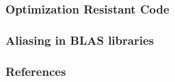 \documentclass{beamer}
\begin{document}
  \begin{frame}
    \frametitle{Optimization Resistant Code}




  \end{frame}

  \begin{frame}
    \frametitle{Aliasing in BLAS libraries}


  \end{frame}


\begin{frame}

\frametitle{References}

\scriptsize{}


\end{frame}
\end{document}
